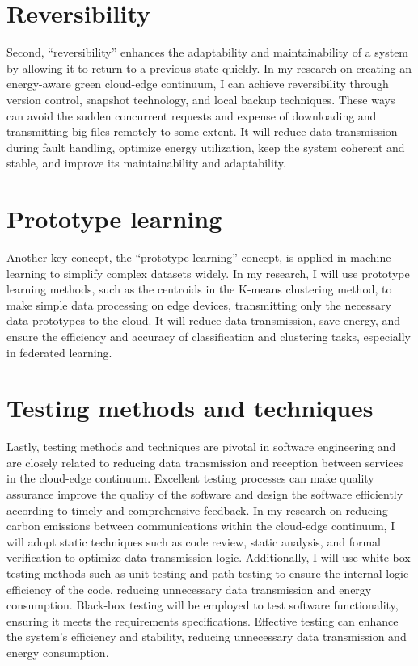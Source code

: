 \documentclass[11pt]{report}
\begin{document}
\section{Reversibility}
\label{sec:reversibility}

Second, ``reversibility'' enhances the adaptability and maintainability of a system by allowing it to return to a previous state quickly. In my research on creating an energy-aware green cloud-edge continuum, I can achieve reversibility through version control, snapshot technology, and local backup techniques. These ways can avoid the sudden concurrent requests and expense of downloading and transmitting big files remotely to some extent. It will reduce data transmission during fault handling, optimize energy utilization, keep the system coherent and stable, and improve its maintainability and adaptability.

\section{Prototype learning}
\label{sec:prototype}

Another key concept, the ``prototype learning'' concept,  is applied in machine learning to simplify complex datasets widely. In my research, I will use prototype learning methods, such as the centroids in the K-means clustering method, to make simple data processing on edge devices, transmitting only the necessary data prototypes to the cloud. It will reduce data transmission, save energy, and ensure the efficiency and accuracy of classification and clustering tasks, especially in federated learning.

\section{Testing methods and techniques}
\label{sec:testing}

Lastly, testing methods and techniques are pivotal in software engineering and are closely related to reducing data transmission and reception between services in the cloud-edge continuum. Excellent testing processes can make quality assurance improve the quality of the software and design the software efficiently according to timely and comprehensive feedback. In my research on reducing carbon emissions between communications within the cloud-edge continuum, I will adopt static techniques such as code review, static analysis, and formal verification to optimize data transmission logic. Additionally, I will use white-box testing methods such as unit testing and path testing to ensure the internal logic efficiency of the code, reducing unnecessary data transmission and energy consumption. Black-box testing will be employed to test software functionality, ensuring it meets the requirements specifications. Effective testing can enhance the system's efficiency and stability, reducing unnecessary data transmission and energy consumption.
\end{document}
